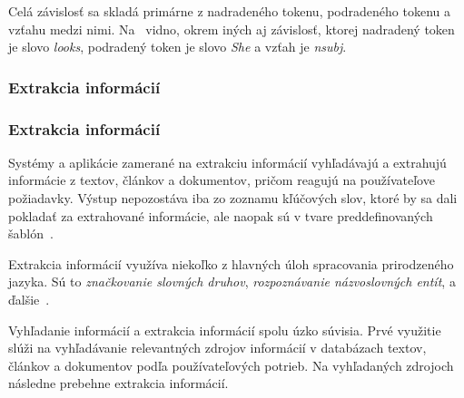 Celá závislosť sa skladá primárne z nadradeného tokenu, podradeného tokenu a vzťahu medzi nimi. Na~ vidno, okrem iných aj závislosť, ktorej nadradený token je slovo \textit{looks}, podradený token je slovo \textit{She} a vzťah je \textit{nsubj}.

%
%
{
	\subsubsection{Extrakcia informácií}
}
{
	\subsubsection{Extrakcia informácií}
}
\label{subsubsec:information_extraction}
Systémy a aplikácie zamerané na extrakciu informácií vyhľadávajú a extrahujú informácie z textov, článkov a dokumentov, pričom reagujú na používateľove požiadavky. Výstup nepozostáva iba zo zoznamu kľúčových slov, ktoré by sa dali pokladať za extrahované informácie, ale naopak sú v tvare preddefinovaných šablón~\cite{Preeti}.

Extrakcia informácií využíva niekoľko z hlavných úloh spracovania prirodzeného jazyka. Sú to \textit{značkovanie slovných druhov}, \textit{rozpoznávanie názvoslovných entít}, a ďalšie~\cite{Preeti}.

Vyhľadanie informácií a extrakcia informácií spolu úzko súvisia. Prvé využitie slúži na vyhľadávanie relevantných zdrojov informácií v databázach textov, článkov a dokumentov podľa používateľových potrieb. Na vyhľadaných zdrojoch následne prebehne extrakcia informácií. 


